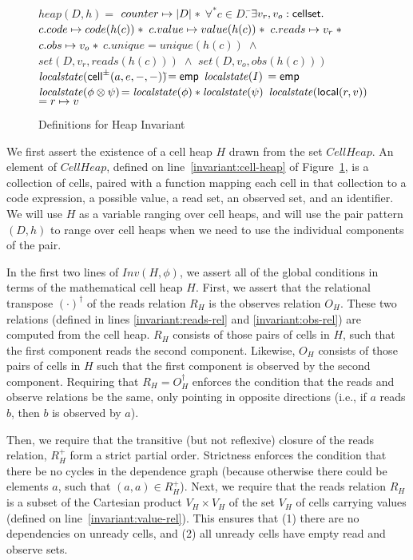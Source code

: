 \documentclass[preprint,natbib]{sigplanconf}
\begin{document}
\begin{figure}
{\begin{specification}
$heap(D,h) = $ \nextline
\;\;$counter \mapsto |D| \;* $ \nextline
\;\;$\forall^* c \in D.\;$\=$\exists v_r, v_o : \mbox{\textsf{{cellset}}}.\;$ \nextline
                         \>$c.code \mapsto code(h(c))   \;* $ \nextline
                         \>$c.value \mapsto value(h(c)) \;* $ \nextline
                         \>$c.reads \mapsto v_r \;* $ \nextline
                         \>$c.obs   \mapsto v_o \;* $ \nextline
                         \>$c.unique  = unique(h(c)) \;\land$ \nextline
                         \>$set(D, v_r, reads(h(c))) \;\land$ \nextline
                         \>$set(D, v_o, obs(h(c)))$
$\mathit{localstate}(\mbox{\textsf{{cell}}}^{\pm}({a}, {e}, {-}, {-}))$\=$= \mathsf{emp}$ \nextline
$\mathit{localstate}(I)$                \>$= \mathsf{emp}$ \nextline
$\mathit{localstate}(\phi \otimes \psi)$\>$= \mathit{localstate}(\phi) * \mathit{localstate}(\psi)$ \nextline
$\mathit{localstate}(\mbox{\textsf{{local}}}({r}, {v}))$  \>$= r \mapsto v$ 
\end{specification}
}
\caption{Definitions for Heap Invariant}
\label{heap-invariant}
\end{figure}

We first assert the existence of a cell heap $H$ drawn from the set
$CellHeap$.  An element of $CellHeap$, defined on
line~\ref{invariant:cell-heap} of Figure~\ref{heap-invariant}, is a
collection of cells, paired with a function mapping each cell in that
collection to a code expression, a possible value, a read set, an
observed set, and an identifier. We will use $H$ as a variable ranging
over cell heaps, and will use the pair pattern $(D,h)$ to range over
cell heaps when we need to use the individual components of the pair.

In the first two lines of $Inv(H, \phi)$, we assert all of the global
conditions in terms of the mathematical cell heap $H$. First, we
assert that the relational transpose $(\cdot)^\dagger$ of the reads
relation $R_H$ is the observes relation $O_H$. These two relations
(defined in lines \ref{invariant:reads-rel} and
\ref{invariant:obs-rel}) are computed from the cell heap. $R_H$
consists of those pairs of cells in $H$, such that the first component
reads the second component. Likewise, $O_H$ consists of those pairs of
cells in $H$ such that the first component is observed by the second
component.  Requiring that $R_H = O^\dagger_H$ enforces the condition
that the reads and observe relations be the same, only pointing in
opposite directions (i.e., if $a$ reads $b$, then $b$ is observed by
$a$).

Then, we require that the transitive (but not reflexive) closure of
the reads relation, $R^+_H$ form a strict partial order. Strictness
enforces the condition that there be no cycles in the dependence graph
(because otherwise there could be elements $a$, such that $(a, a) \in
R^+_H$).  Next, we require that the reads relation $R_H$ is a subset
of the Cartesian product $V_H \times V_H$ of the set $V_H$ of cells
carrying values (defined on line~\ref{invariant:value-rel}). This
ensures that (1) there are no dependencies on unready cells, and (2)
all unready cells have empty read and observe sets.
\end{document}
